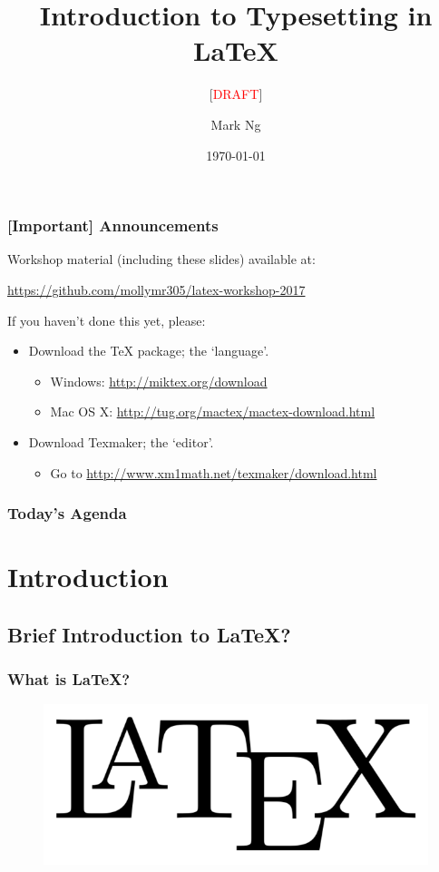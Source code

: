 \documentclass{beamer}
\title[Introduction to Typesetting in \LaTeX{}]{
    Introduction to Typesetting in \LaTeX{}
}
\subtitle{[\textcolor{red}{DRAFT}]}
\author{Mark Ng}
\institute[NUS]{
    National University of Singapore\\
    \medskip
    \textit{latexify@nusmathsoc.org}
}
\date{\today}
\begin{document}
    \begin{frame}
        \titlepage
    \end{frame}

    \begin{frame}
        \frametitle{[Important] Announcements}
        Workshop material (including these slides) available at:
        \begin{center}
            \url{https://github.com/mollymr305/latex-workshop-2017}
        \end{center}
        If you haven't done this yet, please:
        \begin{itemize}
            \item Download the \TeX{} package; the `language'.
            \begin{itemize}
                \item Windows: \url{http://miktex.org/download}
                \item Mac OS X: \url{http://tug.org/mactex/mactex-download.html}
            \end{itemize}
            \item Download Texmaker; the `editor'.
            \begin{itemize}
                \item Go to \url{http://www.xm1math.net/texmaker/download.html}
            \end{itemize}
        \end{itemize}
    \end{frame}


    \begin{frame}
        \frametitle{Today's Agenda}
        \tableofcontents
    \end{frame}

    \section{Introduction}
    \subsection{Brief Introduction to \LaTeX{}?}
    \begin{frame}
        \frametitle{What is \LaTeX{}?}
        \begin{figure}[H]
            \includegraphics[scale=0.2]{logo.png}
        \end{figure}
    \end{frame}
\end{document}
